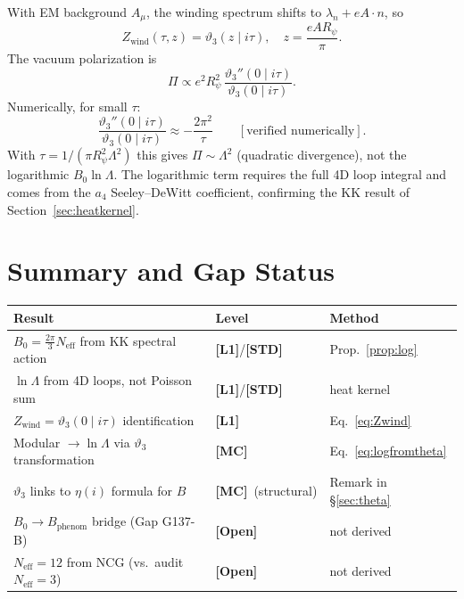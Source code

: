 \documentclass[12pt,a4paper]{article}
\theoremstyle{remark}
\newcommand{\MC}{\textbf{[MC]}}
\newcommand{\OPEN}{\textbf{[Open]}}
\newcommand{\Lone}{\textbf{[L1]}}
\newcommand{\STD}{\textbf{[STD]}}
\begin{document}
With EM background $A_\mu$, the winding spectrum shifts to
$\lambda_n + eA\cdot n$, so
\begin{equation}
  Z_{\mathrm{wind}}(\tau, z) = \vartheta_3(z\mid i\tau),
  \quad z = \frac{eAR_\psi}{\pi}.
\end{equation}
The vacuum polarization is
\begin{equation}
  \Pi \propto e^2 R_\psi^2\,\frac{\vartheta_3''(0\mid i\tau)}{\vartheta_3(0\mid i\tau)}.
  \label{eq:vacpol}
\end{equation}
Numerically, for small $\tau$:
\begin{equation}
  \frac{\vartheta_3''(0\mid i\tau)}{\vartheta_3(0\mid i\tau)}
  \approx -\frac{2\pi^2}{\tau}
  \qquad[\text{verified numerically}].
\end{equation}
With $\tau = 1/(\pi R_\psi^2\Lambda^2)$ this gives $\Pi\sim\Lambda^2$
(quadratic divergence), not the logarithmic $B_0\ln\Lambda$.
The logarithmic term requires the full 4D loop integral and
comes from the $a_4$ Seeley--DeWitt coefficient, confirming the
KK result of Section~\ref{sec:heatkernel}.

\section{Summary and Gap Status}
\label{sec:summary}

\begin{tcolorbox}[colback=green!4!white,colframe=green!55!black,
  title={NCG derivation of $B_0$ — status summary}]
\begin{center}
\begin{tabular}{lll}
\toprule
\textbf{Result} & \textbf{Level} & \textbf{Method} \\
\midrule
$B_0 = \tfrac{2\pi}{3}N_{\mathrm{eff}}$ from KK spectral action
  & \Lone/\STD & Prop.~\ref{prop:log} \\
$\ln\Lambda$ from 4D loops, not Poisson sum
  & \Lone/\STD & heat kernel \\
$Z_{\mathrm{wind}} = \vartheta_3(0\mid i\tau)$ identification
  & \Lone & Eq.~\eqref{eq:Zwind} \\
Modular $\to\ln\Lambda$ via $\vartheta_3$ transformation
  & \MC & Eq.~\eqref{eq:logfromtheta} \\
$\vartheta_3$ links to $\eta(i)$ formula for $B$
  & \MC\ (structural) & Remark in §\ref{sec:theta} \\
\midrule
$B_0\to B_{\mathrm{phenom}}$ bridge (Gap G137-B)
  & \OPEN & not derived \\
$N_{\mathrm{eff}}=12$ from NCG (vs.\ audit $N_{\mathrm{eff}}=3$)
  & \OPEN & not derived \\
\bottomrule
\end{tabular}
\end{center}
\end{tcolorbox}
\end{document}
